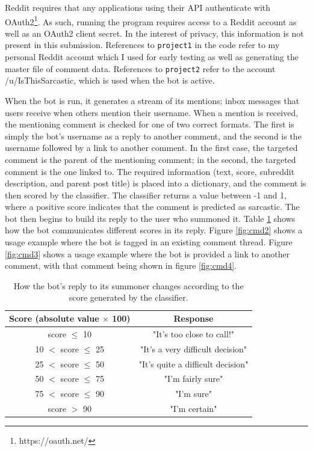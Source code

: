 \documentclass[a4paper,12pt]{article}
\begin{document}
Reddit requires that any applications using their API authenticate with OAuth2\footnote{https://oauth.net/}. As such, running the program requires access to a Reddit account as well as an OAuth2 client secret. In the interest of privacy, this information is not present in this submission. References to \texttt{project1} in the code refer to my personal Reddit account which I used for early testing as well as generating the master file of comment data. References to \texttt{project2} refer to the account /u/IsThisSarcastic, which is used when the bot is active.

When the bot is run, it generates a stream of its mentions; inbox messages that users receive when others mention their username. When a mention is received, the mentioning comment is checked for one of two correct formats. The first is simply the bot's username as a reply to another comment, and the second is the username followed by a link to another comment. In the first case, the targeted comment is the parent of the mentioning comment; in the second, the targeted comment is the one linked to. The required information (text, score, subreddit description, and parent post title) is placed into a dictionary, and the comment is then scored by the classifier. The classifier returns a value between -1 and 1, where a positive score indicates that the comment is predicted as sarcastic. The bot then begins to build its reply to the user who summoned it. Table \ref{tab:cmd1} shows how the bot communicates different scores in its reply. Figure \ref{fig:cmd2} shows a usage example where the bot is tagged in an existing comment thread. Figure \ref{fig:cmd3} shows a usage example where the bot is provided a link to another comment, with that comment being shown in figure \ref{fig:cmd4}.

\begin{table}[H]
\begin{tabular}{|c|c|}
\hline
\textbf{Score (absolute value $\times$ 100)} & \textbf{Response}                      \\ \hline
score $\leq$ 10                                    & "It's too close to call!"        \\ \hline
10 $<$ score $\leq$ 25                            & "It's a very difficult decision"  \\ \hline
25 $<$ score $\leq$ 50                            & "It's quite a difficult decision" \\ \hline
50 $<$ score $\leq$ 75                            & "I'm fairly sure"                 \\ \hline
75 $<$ score $\leq$ 90                            & "I'm sure"                        \\ \hline
score $>$ 90                                       & "I'm certain"                    \\ \hline
\end{tabular}
\caption{How the bot's reply to its summoner changes according to the score generated by the classifier.}
\label{tab:cmd1}
\end{table}
\end{document}
